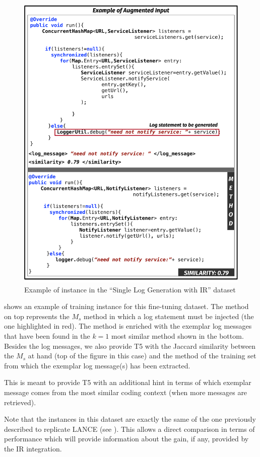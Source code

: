 \begin{figure}[h!]
	\centering
	\includegraphics[width=0.70\columnwidth]{img/ir-example.pdf}
	\vspace{-0.2cm}
	\caption{Example of instance in the ``Single Log Generation with IR'' dataset}
	\label{fig:ir-example}
\end{figure}


 shows an example of training instance for this fine-tuning dataset. The method on top represents the $M_{s}$ \java method in which a log statement must be injected (\ie the one highlighted in red). The method is enriched with the exemplar log messages that have been found in the $k=1$ most similar method shown in the bottom. Besides the log messages, we also provide T5 with the Jaccard similarity between the $M_{s}$ at hand (top of the figure in this case) and the method of the training set from which the exemplar log message(s) has been extracted. 

This is meant to provide T5 with an additional hint in terms of which exemplar message comes from the most similar coding context (when more messages are retrieved).

Note that the instances in this dataset are exactly the same of the one previously described to replicate LANCE (see ). This allows a direct comparison in terms of performance which will provide information about the gain, if any, provided by the IR integration.


